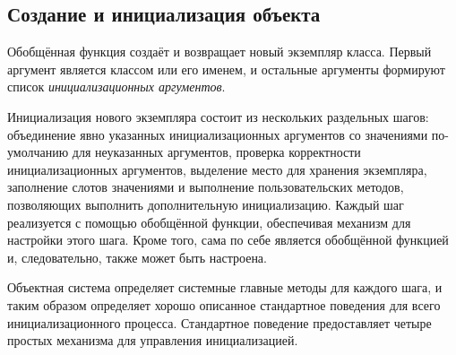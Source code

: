 \subsection{Создание и инициализация объекта}
\label{Object-Creation-and-Initialization-SECTION}

Обобщённая функция  создаёт и возвращает новый экземпляр
класса. Первый аргумент является классом или его именем, и остальные аргументы
формируют список \emph{инициализационных аргументов}.

Инициализация нового экземпляра состоит из нескольких раздельных шагов:
объединение явно указанных инициализационных аргументов со значениями по-умолчанию
для неуказанных аргументов, проверка корректности инициализационных аргументов,
выделение место для хранения экземпляра, заполнение слотов значениями
и выполнение пользовательских методов, позволяющих выполнить дополнительную
инициализацию. Каждый шаг  реализуется
с помощью обобщённой функции, обеспечивая механизм для настройки этого шага. 
Кроме того,  сама по себе является обобщённой функцией и, следовательно,
также может быть настроена.

Объектная система определяет системные главные методы для каждого шага, и таким
образом определяет хорошо описанное стандартное поведения для всего
инициализационного процесса. Стандартное поведение предоставляет четыре
простых механизма для управления инициализацией.

